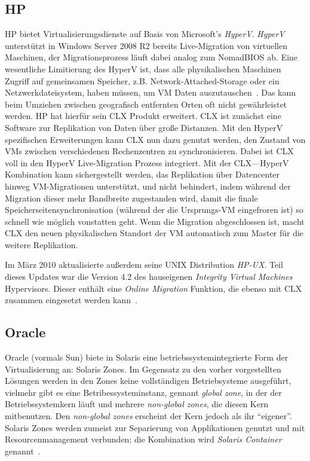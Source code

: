 \subsection{HP}
HP bietet Virtualisierungsdienste auf Basis von Microsoft's
\emph{HyperV}. \emph{HyperV} unterstützt in Windows Server 2008 R2
bereits Live-Migration von virtuellen Maschinen, der Migrationsprozess
läuft dabei analog zum NomadBIOS ab. Eine wesentliche Limitierung des
HyperV ist, dass alle physikalischen Maschinen Zugriff auf gemeinsamen
Speicher, z.B. Network-Attached-Storage oder ein Netzwerkdateisystem,
haben müssen, um \ac{VM} Daten auszutauschen~\cite{hp2010hyperV}. Das kann
beim Umziehen zwischen geografisch entfernten Orten oft nicht
gewährleistet werden. HP hat hierfür sein \ac{CLX} Produkt
erweitert. \ac{CLX} ist zunächst eine Software zur Replikation von Daten
über große Distanzen. Mit den HyperV spezifischen Erweiterungen kann
\ac{CLX} nun dazu genutzt werden, den Zustand von \acp{VM} zwischen
verschiedenen Rechenzentren zu synchronisieren. Dabei ist \ac{CLX} voll in
den HyperV Live-Migration Prozess integriert. Mit der \ac{CLX}---HyperV
Kombination kann sichergestellt werden, das Replikation über
Datencenter hinweg \ac{VM}-Migrationen unterstützt, und nicht behindert,
indem während der Migration dieser mehr Bandbreite zugestanden wird,
damit die finale Speicherseitensynchronisation (während der die
Ursprungs-\ac{VM} eingefroren ist) so schnell wie möglich vonstatten
geht. Wenn die Migration abgeschlossen ist, macht \ac{CLX} den neuen
physikalischen Standort der \ac{VM} automatisch zum Master für die weitere
Replikation.

Im März 2010 aktualisierte außerdem seine UNIX Distribution
\emph{HP-UX}. Teil dieses Updates war die Version 4.2 des hauseigenen
\emph{Integrity Virtual Machines} Hypervisors. Dieser enthält eine
\emph{Online Migration} Funktion, die ebenso mit \ac{CLX} zusammen
eingesetzt werden kann~\cite{hp2010integrity}.

\subsection{Oracle}

Oracle (vormals Sun) biete in Solaris eine betriebssystemintegrierte
Form der Virtualisierung an: Solaris Zones. Im Gegensatz zu den vorher
vorgestellten Lösungen werden in den Zones keine vollständigen
Betriebsysteme ausgeführt, vielmehr gibt es eine
Betribessysteminstanz, gennant \emph{global zone}, in der der
Betriebssystemkern läuft und mehrere \emph{non-global zones}, die
diesen Kern mitbenutzen. Den \emph{non-global zones} erscheint der
Kern jedoch als ihr "`eigener"'. Solaris Zones werden zumeist zur
Separierung von Applikationen genutzt und mit Resourcenmanagement
verbunden; die Kombination wird \emph{Solaris Container} genannt~\cite{price2004solaris}.

